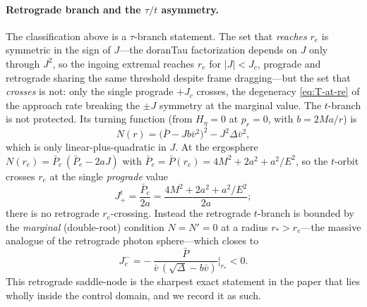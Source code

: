 \documentclass[12pt]{iopart}
\theoremstyle{plain}
\theoremstyle{definition}
\theoremstyle{remark}
\newcommand{\re}{r_{e}}
\newcommand{\Jc}{J_{c}}
\begin{document}
\paragraph{Retrograde branch and the $\tau/t$ asymmetry.} The classification above
is a $\tau$-branch statement. The set that \emph{reaches} $\re$ is symmetric in
the sign of $J$---the doranTau factorization depends on $J$ only through $J^2$, so
the ingoing extremal reaches $\re$ for $|J|<\Jc$, prograde and retrograde sharing
the same threshold despite frame dragging---but the set that \emph{crosses} is
not: only the single prograde $+\Jc$ crosses, the degeneracy
\eqref{eq:T-at-re} of the approach rate breaking the $\pm J$ symmetry at the
marginal value. The $t$-branch is not protected. Its turning function (from
$H_\eta=0$ at $p_r=0$, with $b=2Ma/r$) is
\begin{equation}
    N(r)=\big(\bar P-Jb\bar v^2\big)^2-J^2\Delta\bar v^2,
    \label{eq:tbranch-turn}
\end{equation}
which is only linear-plus-quadratic in $J$. At the ergosphere
$N(\re)=\bar P_e\,(\bar P_e-2aJ)$ with
$\bar P_e=\bar P(\re)=4M^2+2a^2+a^2/E^2$, so the $t$-orbit crosses $\re$ at the
single \emph{prograde} value
\begin{equation}
    J_+^{t}=\frac{\bar P_e}{2a}=\frac{4M^2+2a^2+a^2/E^2}{2a};
    \label{eq:Jplus-t}
\end{equation}
there is no retrograde $r_e$-crossing. Instead the retrograde $t$-branch is
bounded by the \emph{marginal} (double-root) condition $N=N'=0$ at a radius
$r_*>\re$---the massive analogue of the retrograde photon sphere---which closes
to
\begin{equation}
    J_c^{-}=-\,\frac{\bar P}{\bar v\,(\sqrt\Delta-b\bar v)}\bigg|_{r_*}<0 .
    \label{eq:Jc-minus}
\end{equation}
This retrograde saddle-node is the sharpest exact statement in the paper that
lies wholly inside the control domain, and we record it as such.
\end{document}
